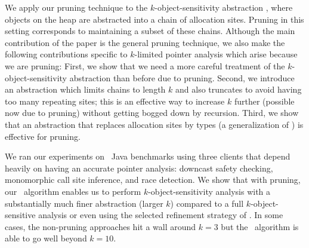 
We apply our pruning technique to the $k$-object-sensitivity abstraction
\cite{kobj}, where objects on the heap are abstracted into a chain of
allocation sites.  Pruning in this setting corresponds to maintaining a subset
of these chains.  Although the main contribution of the paper is the general
pruning technique, we also make the following contributions specific to
$k$-limited pointer analysis which arise because we are pruning: First, we show
that we need a more careful treatment of the $k$-object-sensitivity abstraction
than before due to pruning.  Second, we introduce an abstraction which limits
chains to length $k$ and also truncates to avoid having too many repeating
sites; this is an effective way to increase $k$ further (possible now due to
pruning) without getting bogged down by recursion.  Third, we show that an
abstraction that replaces allocation sites by types (a generalization of
\cite{smaragdakis11context}) is effective for pruning.

We ran our experiments on \numBenchmarks\ Java benchmarks using three clients that
depend heavily on having an accurate pointer analysis: downcast safety
checking, monomorphic call site inference, and race detection.
We show that with pruning, our \PR\ algorithm enables us to perform $k$-object-sensitivity
analysis with a substantially much finer abstraction (larger $k$)
compared to a full $k$-object-sensitive analysis or even using the selected
refinement strategy of \cite{liang11minimal}.
In some cases, the non-pruning approaches hit a wall around $k=3$ but the \PR\
algorithm is able to go well beyond $k=10$.
